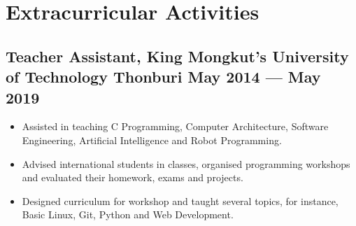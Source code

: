 \documentclass{article}
\newenvironment{zitemize}{
\begin{itemize}\itemsep0pt \parskip0pt \parsep1pt}
{\end{itemize}\vspace{-0.5cm}}
\newcommand{\hskills}[1]{
\textbf{\bfseries #1} }
\begin{document}

    \section{Extracurricular Activities} %
    \vspace{-0.1cm}
        \subsection*{Teacher Assistant, {\normalsize\normalfont King Mongkut's University of Technology Thonburi} \hfill May 2014 --- May 2019} 
            \begin{zitemize}
                \item Assisted in teaching C Programming, Computer Architecture, Software Engineering, Artificial Intelligence and Robot Programming.
                \item Advised international students in classes, organised programming workshops and evaluated their homework, exams and projects.
                \item Designed curriculum for workshop and taught several topics, for instance, Basic Linux, Git, Python and Web Development.
            \end{zitemize}
\end{document}
